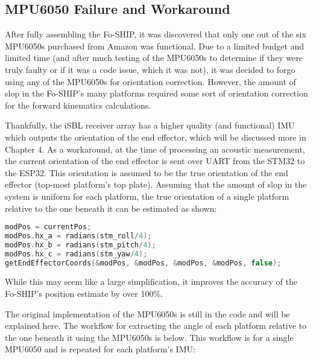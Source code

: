 \documentclass[12pt,a4paper]{report}
\begin{document}
\subsection{MPU6050 Failure and Workaround} \label{ssec:2s5s2}
After fully assembling the Fo-SHIP, it was discovered that only one out of the six MPU6050s purchased from Amazon was functional. Due to a limited budget and limited time (and after much testing of the MPU6050s to determine if they were truly faulty or if it was a code issue, which it was not), it was decided to forgo using any of the MPU6050s for orientation correction. However, the amount of slop in the Fo-SHIP’s many platforms required some sort of orientation correction for the forward kinematics calculations. 

Thankfully, the iSBL receiver array has a higher quality (and functional) IMU which outputs the orientation of the end effector, which will be discussed more in Chapter 4. As a workaround, at the time of processing an acoustic measurement, the current orientation of the end effector is sent over UART from the STM32 to the ESP32. This orientation is assumed to be the true orientation of the end effector (top-most platform’s top plate). Assuming that the amount of slop in the system is uniform for each platform, the true orientation of a single platform relative to the one beneath it can be estimated as shown:

\begin{lstlisting}[language=C++]
modPos = currentPos;
modPos.hx_a = radians(stm_roll/4);
modPos.hx_b = radians(stm_pitch/4);
modPos.hx_c = radians(stm_yaw/4);
getEndEffectorCoords(&modPos, &modPos, &modPos, &modPos, false);
\end{lstlisting}

While this may seem like a large simplification, it improves the accuracy of the Fo-SHIP’s position estimate by over 100\%. 

The original implementation of the MPU6050s is still in the code and will be explained here. The workflow for extracting the angle of each platform relative to the one beneath it using the MPU6050s is below. This workflow is for a single MPU6050 and is repeated for each platform's IMU:
\end{document}
